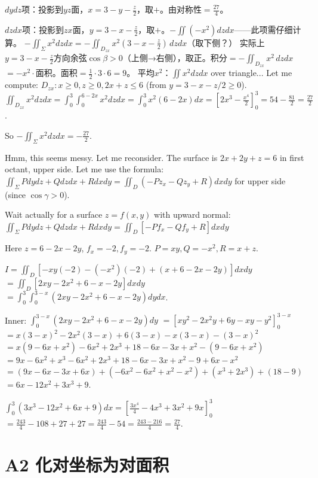 \documentclass[12pt,a4paper]{ctexart}
\newcommand{\answerbox}[1]{\begin{center}\fbox{\color{red}\large\bfseries #1}\end{center}}
\begin{document}
$dydz$项：投影到$yz$面，$x=3-y-\frac z2$，取$+$。由对称性$=\frac{27}{4}$。

$dzdx$项：投影到$zx$面，$y=3-x-\frac z2$，取$+$。$-\iint(-x^2)dzdx$——此项需仔细计算。
$-\iint_\Sigma x^2dzdx=-\iint_{D_{zx}}x^2(3-x-\frac z2)\,dzdx$（取下侧？）
实际上$y=3-x-\frac z2$方向余弦$\cos\beta>0$（上侧→右侧），取正。积分$=-\iint_{D_{zx}}x^2\,dzdx$
$=-x^2\cdot$面积。面积$=\frac12\cdot3\cdot6=9$。
平均$x^2$：$\iint x^2 dzdx$ over triangle...
Let me compute: $D_{zx}: x\ge0,z\ge0,2x+z\le6$ (from $y=3-x-z/2\ge0$).
$\iint_{D_{zx}} x^2 dzdx = \int_0^3\int_0^{6-2x} x^2 dz dx = \int_0^3 x^2(6-2x)dx = [2x^3-\frac{x^4}{2}]_0^3 = 54-\frac{81}{2} = \frac{27}{2}$.

So $-\iint_\Sigma x^2dzdx = -\frac{27}{2}$.

Hmm, this seems messy. Let me reconsider. The surface is $2x+2y+z=6$ in first octant, upper side. Let me use the formula:
$\iint_\Sigma P dydz+Q dzdx+R dxdy = \iint_D (-P z_x - Q z_y + R)dxdy$ for upper side (since $\cos\gamma>0$).

Wait actually for a surface $z=f(x,y)$ with upward normal:
$\iint_\Sigma P dydz+Q dzdx+R dxdy = \iint_D [-P f_x - Q f_y + R]dxdy$

Here $z=6-2x-2y$, $f_x=-2,f_y=-2$.
$P=xy, Q=-x^2, R=x+z$.

$I = \iint_D [-xy(-2) - (-x^2)(-2) + (x+6-2x-2y)]dxdy$
$= \iint_D [2xy - 2x^2 + 6 - x - 2y]dxdy$
$= \int_0^3\int_0^{3-x} (2xy - 2x^2 + 6 - x - 2y)dydx$.

Inner: $\int_0^{3-x} (2xy - 2x^2 + 6 - x - 2y)dy$
$= [xy^2 - 2x^2y + 6y - xy - y^2]_0^{3-x}$
$= x(3-x)^2 - 2x^2(3-x) + 6(3-x) - x(3-x) - (3-x)^2$
$= x(9-6x+x^2) - 6x^2 + 2x^3 + 18-6x - 3x+x^2 - (9-6x+x^2)$
$= 9x-6x^2+x^3 - 6x^2 + 2x^3 + 18-6x - 3x+x^2 - 9+6x-x^2$
$= (9x-6x-3x+6x) + (-6x^2-6x^2+x^2-x^2) + (x^3+2x^3) + (18-9)$
$= 6x - 12x^2 + 3x^3 + 9$.

$\int_0^3 (3x^3-12x^2+6x+9)dx = [\frac{3x^4}{4}-4x^3+3x^2+9x]_0^3$
$= \frac{243}{4} - 108 + 27 + 27 = \frac{243}{4} - 54 = \frac{243-216}{4} = \frac{27}{4}$.

\answerbox{$\frac{27}{4}$}

\section{A2 化对坐标为对面积}

\end{document}
